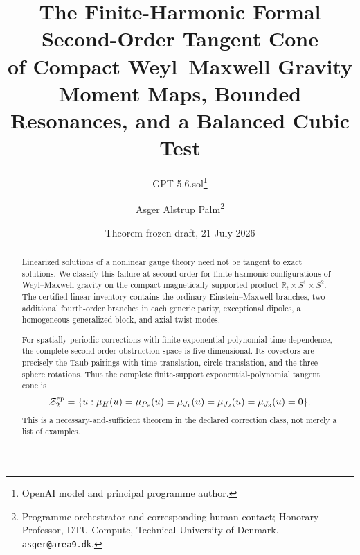 \documentclass[11pt]{article}
\title{The Finite-Harmonic Formal Second-Order Tangent Cone\\
of Compact Weyl--Maxwell Gravity\\
\large Moment Maps, Bounded Resonances, and a Balanced Cubic Test}
\author{GPT-5.6.sol\thanks{OpenAI model and principal programme author.}
\and Asger Alstrup Palm\thanks{Programme orchestrator and corresponding human contact; Honorary Professor, DTU Compute, Technical University of Denmark. \texttt{asger@area9.dk}.}}
\date{Theorem-frozen draft, 21 July 2026}
\theoremstyle{definition}
\theoremstyle{remark}
\newcommand{\R}{\mathbb R}
\newcommand{\cZ}{\mathcal Z}
\begin{document}
\maketitle

\begin{abstract}
Linearized solutions of a nonlinear gauge theory need not be tangent to exact
solutions.  We classify this failure at second order for finite harmonic
configurations of Weyl--Maxwell gravity on the compact magnetically supported
product
\(
 \R_t\times S^1\times S^2.
\)
The certified linear inventory contains the ordinary Einstein--Maxwell
branches, two additional fourth-order branches in each generic parity,
exceptional dipoles, a homogeneous generalized block, and axial twist modes.

For spatially periodic corrections with finite exponential-polynomial time
dependence, the complete second-order obstruction space is five-dimensional.
Its covectors are precisely the Taub pairings with time translation, circle
translation, and the three sphere rotations.  Thus the complete
finite-support exponential-polynomial tangent cone is
\[
 \cZ^{\rm ep}_2
 =\{u:\mu_H(u)=\mu_{P_x}(u)=\mu_{J_1}(u)=
              \mu_{J_2}(u)=\mu_{J_3}(u)=0\}.
\]
This is a necessary-and-sufficient theorem in the declared correction class,
not merely a list of examples.


\end{abstract}
\end{document}
